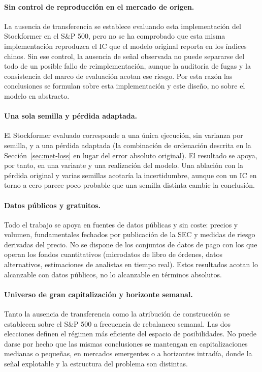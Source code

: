 \paragraph{Sin control de reproducción en el mercado de origen.} La ausencia de
transferencia se establece evaluando esta implementación del Stockformer en el S\&P 500,
pero no se ha comprobado que esta misma implementación reproduzca el IC que el modelo
original reporta en los índices chinos. Sin ese control, la ausencia de señal observada no
puede separarse del todo de un posible fallo de reimplementación, aunque la auditoría de
fugas y la consistencia del marco de evaluación acotan ese riesgo. Por esta razón las
conclusiones se formulan sobre esta implementación y este diseño, no sobre el modelo en
abstracto.

\paragraph{Una sola semilla y pérdida adaptada.} El Stockformer evaluado corresponde a una
única ejecución, sin varianza por semilla, y a una pérdida adaptada (la combinación de
ordenación descrita en la Sección~\ref{sec:met-loss} en lugar del error absoluto
original). El resultado se apoya, por tanto, en una variante y una realización del modelo.
Una ablación con la pérdida original y varias semillas acotaría la incertidumbre, aunque
con un IC en torno a cero parece poco probable que una semilla distinta cambie la
conclusión.

\paragraph{Datos públicos y gratuitos.} Todo el trabajo se apoya en fuentes de datos
públicas y sin coste: precios y volumen, fundamentales fechados por publicación de la SEC
\autocite{sec2025edgar} y medidas de riesgo derivadas del precio. No se dispone de los
conjuntos de datos de pago con los que operan los fondos cuantitativos (microdatos de
libro de órdenes, datos alternativos, estimaciones de analistas en tiempo real). Estos
resultados acotan lo alcanzable con datos públicos, no lo alcanzable en términos
absolutos.

\paragraph{Universo de gran capitalización y horizonte semanal.} Tanto la ausencia de
transferencia como la atribución de construcción se establecen sobre el S\&P 500 a
frecuencia de rebalanceo semanal. Las dos elecciones definen el régimen más eficiente del
espacio de posibilidades. No puede darse por hecho que las mismas conclusiones se
mantengan en capitalizaciones medianas o pequeñas, en mercados emergentes o a horizontes
intradía, donde la señal explotable y la estructura del problema son distintas.


